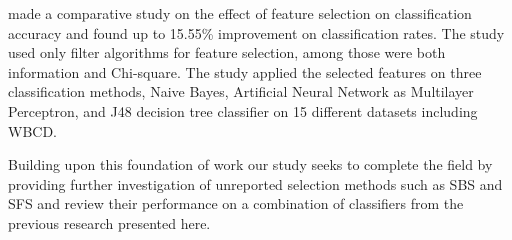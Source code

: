 \textcite{karabulut2012} made a comparative study on the effect of feature selection on classification accuracy and found up to 15.55\% improvement on classification rates. The study used only filter algorithms for feature selection, among those were both information and Chi-square. The study applied the selected features on three classification methods, Naive Bayes, Artificial Neural Network as Multilayer Perceptron, and J48 decision tree classifier on 15 different datasets including WBCD.

Building upon this foundation of work our study seeks to complete the field by providing further investigation of unreported selection methods such as SBS and SFS and review their performance on a combination of classifiers from the previous research presented here.
